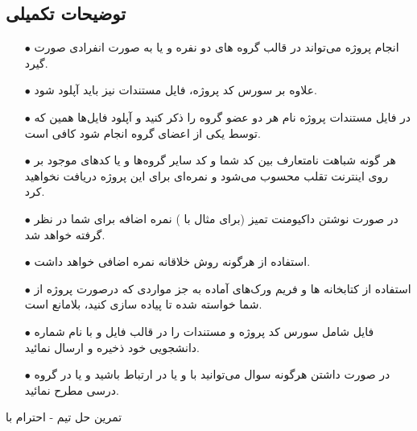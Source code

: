 \documentclass{article}
\begin{document}
	\subsection*{توضیحات تکمیلی}
	\begin{itemize}
		\item [$\bullet$] انجام پروژه می‌تواند در قالب گروه های دو نفره و یا به صورت انفرادی صورت گیرد.
		
		\item [$\bullet$] علاوه بر سورس کد پروژه، فایل مستندات  نیز باید آپلود شود.
		
		\item [$\bullet$] در فایل مستندات پروژه نام هر دو عضو گروه را ذکر کنید و آپلود فایل‌ها همین که توسط یکی از اعضای گروه انجام شود کافی است.
		
		\item [$\bullet$] هر گونه شباهت نامتعارف بین کد شما و کد سایر گروه‌ها و یا کدها‌ی موجود بر روی اینترنت تقلب محسوب می‌شود و نمره‌ای برای این پروژه دریافت نخواهید کرد.
		
		\item [$\bullet$] در صورت نوشتن داکیومنت تمیز (برای مثال با \lr{\LaTeX}) نمره اضافه برای شما در نظر گرفته خواهد شد.
		
		\item [$\bullet$] استفاده از هرگونه روش خلاقانه نمره اضافی خواهد داشت.
		
		\item [$\bullet$] استفاده از کتابخانه ها و فریم ورک‌های آماده به جز مواردی که درصورت پروژه از شما خواسته شده تا پیاده سازی کنید، بلامانع است.
		
		\item [$\bullet$] فایل شامل سورس کد پروژه و مستندات را در قالب فایل  و با نام شماره دانشجویی خود ذخیره و ارسال نمائید.
		
		\item [$\bullet$] در صورت داشتن هرگونه سوال می‌توانید با  و یا  در ارتباط باشید و یا در گروه درسی مطرح نمائید.
		\newline
	\end{itemize}
	
	\begin{LTR}
		
		تمرین حل تیم - احترام با
	\end{LTR}
	
	
	
\end{document}
